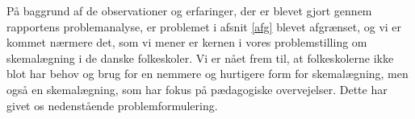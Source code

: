 På baggrund af de observationer og erfaringer, der er blevet gjort gennem rapportens problemanalyse, er problemet i afsnit \ref{afg} blevet afgrænset, og vi er kommet nærmere det, som vi mener er kernen i vores problemstilling om skemalægning i de danske folkeskoler. Vi er nået frem til, at folkeskolerne ikke blot har behov og brug for en nemmere og hurtigere form for skemalægning, men også en skemalægning, som har fokus på pædagogiske overvejelser. Dette har givet os nedenstående problemformulering.

